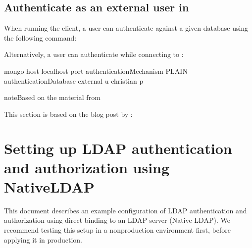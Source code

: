 \documentclass[letterpaper,10pt,english]{sphinxmanual}
\begin{document}
\section{Authenticate as an external user in }
\label{\detokenize{sasl-auth:authenticate-as-an-external-user-in-psmdb}}
\sphinxAtStartPar
When running the  client, a user can authenticate
against a given database using the following command:

\begin{sphinxVerbatim}[commandchars=\\\{\}]
\end{sphinxVerbatim}

\sphinxAtStartPar
Alternatively, a user can authenticate while connecting to :

\begin{sphinxVerbatim}[commandchars=\\\{\}]
\PYGZdl{} mongo \PYGZhy{}\PYGZhy{}host localhost \PYGZhy{}\PYGZhy{}port  \PYGZhy{}\PYGZhy{}authenticationMechanism PLAIN \PYGZhy{}\PYGZhy{}authenticationDatabase external \PYGZhy{}u christian \PYGZhy{}p
\end{sphinxVerbatim}

\begin{sphinxadmonition}{note}{Based on the material from }

\sphinxAtStartPar
This section is based on the blog post  by :
\end{sphinxadmonition}


\chapter{Setting up LDAP authentication and authorization using NativeLDAP}
\label{\detokenize{ldap-setup:setting-up-ldap-authentication-and-authorization-using-nativeldap}}\label{\detokenize{ldap-setup:ldap-setup}}\label{\detokenize{ldap-setup::doc}}
\sphinxAtStartPar
This document describes an example configuration of LDAP authentication and authorization using direct binding to an LDAP server (Native LDAP). We recommend testing this setup in a non\sphinxhyphen{}production environment first, before applying it in production.
\end{document}
